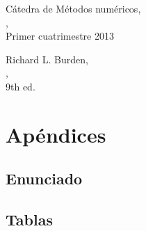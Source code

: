 \documentclass[%
	compressed,
	titlepage,
	narroweqnarray,
	inline,
	twoside,
	]{ieee}
\begin{document}



\begin{thebibliography}{1}

	C\'atedra de M\'etodos num\'ericos,\\
	,\\
	\newblock Primer cuatrimestre 2013

	Richard L. Burden, \\
	, \\
	\newblock 9th ed.

\end{thebibliography}


\newpage

\section{Ap\'endices}

\subsection{Enunciado}


\newpage



\newpage

\subsection{Tablas}


\end{document}
